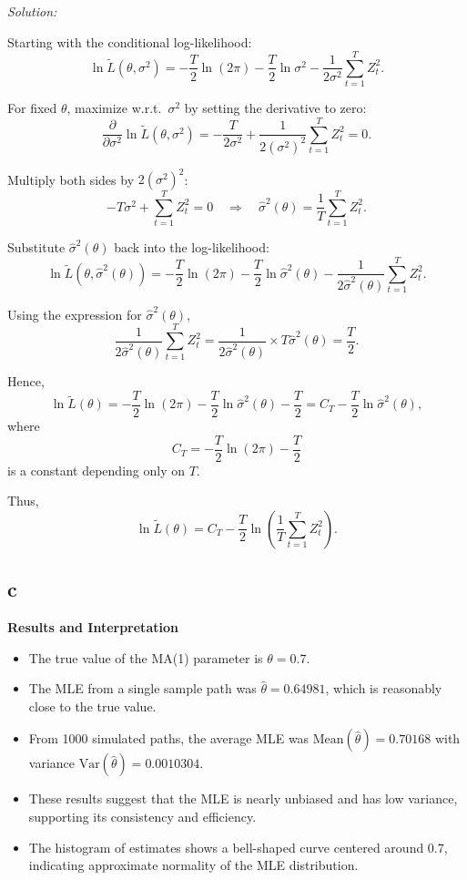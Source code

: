 \documentclass{article}
\begin{document}
\medskip

\textit{Solution:}

Starting with the conditional log-likelihood:
\[
\ln \tilde{L}(\theta, \sigma^2) = -\frac{T}{2} \ln(2\pi) - \frac{T}{2} \ln \sigma^2 - \frac{1}{2\sigma^2} \sum_{t=1}^T Z_t^2.
\]

For fixed \(\theta\), maximize w.r.t.\ \(\sigma^2\) by setting the derivative to zero:
\[
\frac{\partial}{\partial \sigma^2} \ln \tilde{L}(\theta, \sigma^2) = -\frac{T}{2\sigma^2} + \frac{1}{2 (\sigma^2)^2} \sum_{t=1}^T Z_t^2 = 0.
\]

Multiply both sides by \(2 (\sigma^2)^2\):
\[
- T \sigma^2 + \sum_{t=1}^T Z_t^2 = 0 \quad \Rightarrow \quad \hat{\sigma}^2(\theta) = \frac{1}{T} \sum_{t=1}^T Z_t^2.
\]

Substitute \(\hat{\sigma}^2(\theta)\) back into the log-likelihood:
\[
\ln \tilde{L}(\theta, \hat{\sigma}^2(\theta)) = -\frac{T}{2} \ln(2\pi) - \frac{T}{2} \ln \hat{\sigma}^2(\theta) - \frac{1}{2 \hat{\sigma}^2(\theta)} \sum_{t=1}^T Z_t^2.
\]

Using the expression for \(\hat{\sigma}^2(\theta)\),
\[
\frac{1}{2 \hat{\sigma}^2(\theta)} \sum_{t=1}^T Z_t^2 = \frac{1}{2 \hat{\sigma}^2(\theta)} \times T \hat{\sigma}^2(\theta) = \frac{T}{2}.
\]

Hence,
\[
\ln \tilde{L}(\theta) = -\frac{T}{2} \ln(2\pi) - \frac{T}{2} \ln \hat{\sigma}^2(\theta) - \frac{T}{2} = C_T - \frac{T}{2} \ln \hat{\sigma}^2(\theta),
\]
where
\[
C_T = -\frac{T}{2} \ln(2\pi) - \frac{T}{2}
\]
is a constant depending only on \(T\).

Thus,
\[
\boxed{
\ln \tilde{L}(\theta) = C_T - \frac{T}{2} \ln \left( \frac{1}{T} \sum_{t=1}^T Z_t^2 \right).
}
\]
\subsection{c}
\textbf{Results and Interpretation}

\begin{itemize}
    \item The true value of the MA(1) parameter is $\theta = 0.7$.
    \item The MLE from a single sample path was $\hat{\theta} = 0.64981$, which is reasonably close to the true value.
    \item From 1000 simulated paths, the average MLE was $\text{Mean}(\hat{\theta}) = 0.70168$ with variance $\text{Var}(\hat{\theta}) = 0.0010304$.
    \item These results suggest that the MLE is nearly unbiased and has low variance, supporting its consistency and efficiency.
    \item The histogram of estimates shows a bell-shaped curve centered around 0.7, indicating approximate normality of the MLE distribution.
\end{itemize}
\end{document}

